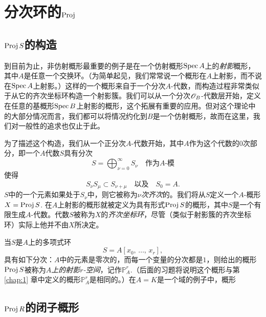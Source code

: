 \section{分次环的\texorpdfstring{$\operatorname{Proj}$}{Proj}}

\subsection{\texorpdfstring{$\operatorname{Proj} S$}{Proj S}的构造}

到目前为止，非仿射概形最重要的例子是在一个仿射概形$\operatorname{Spec} A$上的\textit{射影}概形，其中$A$是任意一个交换环。（为简单起见，我们常常说一个概形在$A$上射影，而不说在$\operatorname{Spec} A$上射影。）这样的一个概形来自于一个分次$A$-代数，而构造过程非常类似于从它的齐次坐标环构造一个射影簇。我们可以从一个分次$\mathscr{O}_B$-代数层开始，定义在任意的基概形$\operatorname{Spec} B$上射影的概形，这个拓展有重要的应用。但对这个理论中的大部分情况而言，我们都可以将情况约化到$B$是一个仿射概形，故而在这里，我们对一般性的追求也仅止于此。

为了描述这个构造，我们从一个正分次$A$-代数开始，其中$A$作为这个代数的$0$次部分，即一个$A$代数$S$具有分次
\[
	S=\bigoplus_{\nu=0}^\infty S_\nu\quad \text{作为$A$-模}
\]
使得
\[
	S_\nu S_\mu \subset S_{\nu+\mu}\quad \text{以及} \quad S_0=A.
\]
$S$中的一个元素如果处于$S_\nu$中，则它被称为$\nu$\textit{次齐次}的。我们将从$S$定义一个$A$-概形$X=\operatorname{Proj} S$. 在$A$上射影的概形就被定义为具有形式$\operatorname{Proj} S$的概形，其中$S$是一个有限生成$A$-代数。代数$S$被称为$X$的\textit{齐次坐标环}，尽管（类似于射影簇的齐次坐标环）实际上他并不由$X$所决定。

当$S$是$A$上的多项式环
\[
	S=A[\text{$x_0$, $\dots$, $x_r$}],
\]
具有如下分次：$A$中的元素是零次的，而每一个变量的分次都是$1$，则给出的概形$\operatorname{Proj} S$被称为\textit{$A$上的射影$r$-空间}，记作$\mathbb{P}_A^r$.（后面的习题将说明这个概形与第 \ref{chap:1} 章中定义的概形$\mathbb{P}_A^r$是相同的。）在$A=K$是一个域的例子中，概形

\subsection{\texorpdfstring{$\operatorname{Proj} R$}{Proj R}的闭子概形}